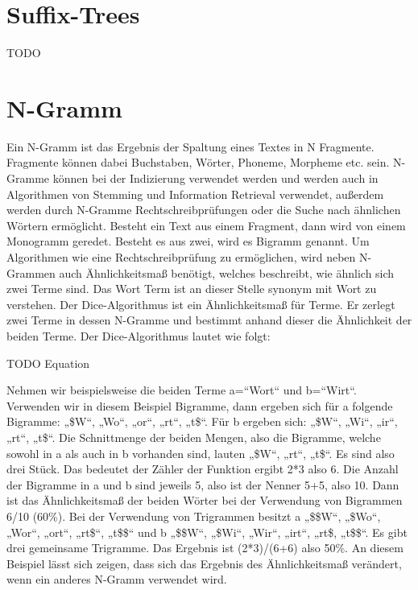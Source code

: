\section{Suffix-Trees}
TODO

\section{N-Gramm}
Ein N-Gramm ist das Ergebnis der Spaltung eines Textes in N Fragmente. Fragmente können dabei Buchstaben, Wörter, Phoneme, Morpheme etc. sein. N-Gramme können bei der Indizierung verwendet werden und werden auch in Algorithmen von Stemming und Information Retrieval verwendet, außerdem werden durch N-Gramme Rechtschreibprüfungen oder die Suche nach ähnlichen Wörtern ermöglicht. Besteht ein Text aus einem Fragment, dann wird von einem Monogramm geredet. Besteht es aus zwei, wird es Bigramm genannt. 
Um Algorithmen wie eine Rechtschreibprüfung zu ermöglichen, wird neben N-Grammen auch Ähnlichkeitsmaß benötigt, welches beschreibt, wie ähnlich sich zwei Terme sind. Das Wort Term ist an dieser Stelle synonym mit Wort zu verstehen. Der Dice-Algorithmus ist ein Ähnlichkeitsmaß für Terme. Er zerlegt zwei Terme in dessen N-Gramme und bestimmt anhand dieser die Ähnlichkeit der beiden Terme. Der Dice-Algorithmus lautet wie folgt:

TODO Equation

Nehmen wir beispielsweise die beiden Terme a=“Wort“ und b=“Wirt“. Verwenden wir in diesem Beispiel Bigramme, dann ergeben sich für a folgende Bigramme: „\$W“, „Wo“, „or“, „rt“, „t\$“. Für b ergeben sich: „\$W“, „Wi“, „ir“, „rt“, „t\$“. Die Schnittmenge der beiden Mengen, also die Bigramme, welche sowohl in a als auch in b vorhanden sind, lauten „\$W“, „rt“, „t\$“. Es sind also drei Stück. Das bedeutet der Zähler der Funktion ergibt 2*3 also 6. Die Anzahl der Bigramme in a und b sind jeweils 5, also ist der Nenner 5+5, also 10. Dann ist das Ähnlichkeitsmaß der beiden Wörter bei der Verwendung von Bigrammen 6/10 (60\%).
Bei der Verwendung von Trigrammen besitzt a „\$\$W“, „\$Wo“, „Wor“, „ort“, „rt\$“, „t\$\$“ und b „\$\$W“, „\$Wi“, „Wir“, „irt“, „rt\$, „t\$\$“. Es gibt drei gemeinsame Trigramme. Das Ergebnis ist (2*3)/(6+6) also 50\%. An diesem Beispiel lässt sich zeigen, dass sich das Ergebnis des Ähnlichkeitsmaß verändert, wenn ein anderes N-Gramm verwendet wird.


